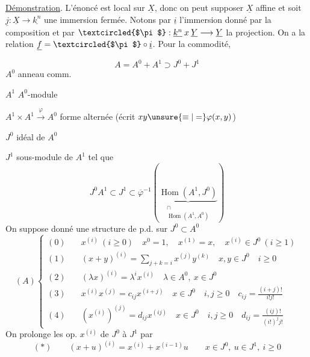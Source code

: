 \uline{Démonstration}. L'énoncé est local sur $\underline X$, donc on peut supposer $\underline X$ affine et soit $\underline j:\underline X\longrightarrow\underline{k^n}$ une immersion fermée. Notons par $\underline i$ l'immersion donné par la composition
et par $\textcircled{$\pi$}:\underline{k^n}\mathbin{x}\underline Y\longrightarrow\underline Y$ la projection. On a la relation $\underline f=\textcircled{$\pi$}\circ\underline i$. Pour la commodité,

\[
A=A^0+A^1\supset J^0+J^1
\]
$A^0$ anneau comm.

$A^1$ $A^0$-module

$A^1\times A^1\xrightarrow{\varphi}A^0$ forme alternée (écrit $xy\unsure{\equiv|=}\varphi(x,y)$)

$J^0$ idéal de $A^0$

$J^1$  sous-module de $A^1$ tel que
\[
J^0A^1\subset J^1\subset\overline\varphi^{-1}\left(\underset{\substack{\cap\\\operatorname{Hom}(A^1,A^0)}}{\underbrace{\operatorname{Hom}(A^1,J^0)}}\right)
\]
On suppose donné une structure de p.d. sur $J^0\subset A^0$
\[
(A)\left\{\begin{aligned}
(0)\quad&x^{(i)}\ (i\geq0)\quad x^0=1,\quad x^{(1)}=x,\quad x^{(i)}\in J^0\ (i\geq1)\\
(1)\quad&(x+y)^{(i)}=\sum_{j+k=i}x^{(j)}y^{(k)}\quad x,y\in J^0\quad i\geq0\\
(2)\quad&(\lambda x)^{(i)}=\lambda^i x^{(i)}\quad\lambda\in A^0,\ x\in J^0\\
(3)\quad&x^{(i)}x^{(j)}=c_{ij}x^{(i+j)}\quad x\in J^0\quad i,j\geq0\quad c_{ij}=\frac{(i+j)!}{i!j!}\\
(4)\quad&(x^{(i)})^{(j)}=d_{ij}x^{(ij)}\quad x\in J^0\quad i,j\geq0\quad d_{ij}=\frac{(ij)!}{(i!)^j j!}
\end{aligned}\right.
\]
On prolonge les op. $x^{(i)}$ de $J^0$ à  $J^1$ par
\[
(*)\qquad(x+u)^{(i)}=x^{(i)}+x^{(i-1)}u\qquad x\in J^0,\ u\in J^1,\ i\geq0
\]

